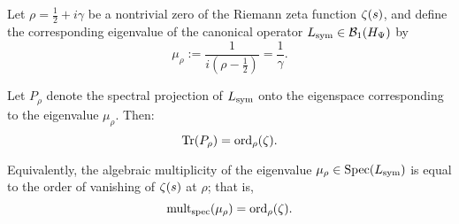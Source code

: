 \begin{lemma}
\label{lem:spectral_multiplicity_matching}
Let \( \rho = \tfrac{1}{2} + i\gamma \) be a nontrivial zero of the Riemann zeta function \( \zeta(s) \), and define the corresponding eigenvalue of the canonical operator \( L_{\mathrm{sym}} \in \mathcal{B}_1(H_{\Psi}) \) by
\[
\mu_\rho := \frac{1}{i(\rho - \tfrac{1}{2})} = \frac{1}{\gamma}.
\]

Let \( P_\rho \) denote the spectral projection of \( L_{\mathrm{sym}} \) onto the eigenspace corresponding to the eigenvalue \( \mu_\rho \). Then:
\[
\operatorname{Tr}(P_\rho) = \operatorname{ord}_\rho(\zeta).
\]

Equivalently, the algebraic multiplicity of the eigenvalue \( \mu_\rho \in \operatorname{Spec}(L_{\mathrm{sym}}) \) is equal to the order of vanishing of \( \zeta(s) \) at \( \rho \); that is,
\[
\operatorname{mult}_{\mathrm{spec}}(\mu_\rho) = \operatorname{ord}_\rho(\zeta).
\]
\end{lemma}

